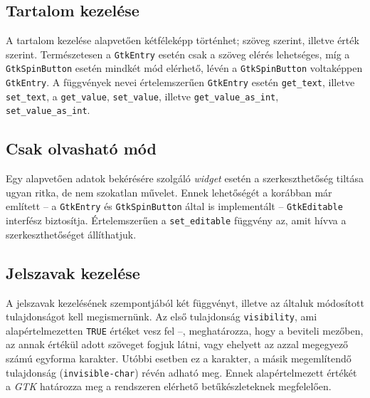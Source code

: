 \subsection{Tartalom kezelése}

A tartalom kezelése alapvetően kétféleképp történhet; szöveg szerint, illetve érték szerint. Természetesen a \texttt{GtkEntry} esetén csak a szöveg elérés lehetséges, míg a \texttt{GtkSpinButton} esetén mindkét mód elérhető, lévén a \texttt{GtkSpinButton} voltaképpen \texttt{GtkEntry}. A függvények nevei értelemszerűen \texttt{GtkEntry} esetén \texttt{get\_text}, illetve \texttt{set\_text}, a \texttt{get\_value}, \texttt{set\_value}, illetve \texttt{get\_value\_as\_int}, \texttt{set\_value\_as\_int}.

\subsection{Csak olvasható mód}

Egy alapvetően adatok bekérésére szolgáló \textit{widget} esetén a szerkeszthetőség tiltása ugyan ritka, de nem szokatlan művelet. Ennek lehetőségét a korábban már említett -- a \texttt{GtkEntry} és \texttt{GtkSpinButton} által is implementált -- \texttt{GtkEditable} interfész biztosítja. Értelemszerűen a \texttt{set\_editable} függvény az, amit hívva a szerkeszthetőséget állíthatjuk.

\subsection{Jelszavak kezelése}

A jelszavak kezelésének szempontjából két függvényt, illetve az általuk módosított tulajdonságot kell megismernünk. Az első tulajdonság \texttt{visibility}, ami alapértelmezetten \texttt{TRUE} értéket vesz fel --, meghatározza, hogy a beviteli mezőben, az annak értékül adott szöveget fogjuk látni, vagy ehelyett az azzal megegyező számú egyforma karakter. Utóbbi esetben ez a karakter, a másik megemlítendő tulajdonság (\texttt{invisible-char}) révén adható meg. Ennek alapértelmezett értékét a \textit{GTK} határozza meg a rendszeren elérhető betűkészleteknek megfelelően.

